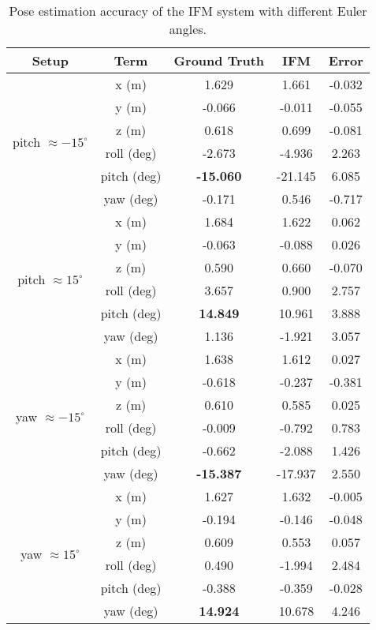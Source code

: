 \begin{table}[H]
	\caption{Pose estimation accuracy of the IFM system with different Euler angles.}
	\begin{center}
		\begin{tabular}{c|c|c|c|c}
			\hline\hline
			Setup & Term & Ground Truth &\textbf{IFM}&Error\\ \hline
			\multirow{6}{*}{ pitch $\approx -15^{\circ}$} &x (m) &1.629   & 1.661   & -0.032  \\  \cline{2-5} 
			&y (m) &-0.066  & -0.011  & -0.055  \\  \cline{2-5} 
			&z (m) &0.618   & 0.699   & -0.081  \\  \cline{2-5} 
			&roll (deg) &-2.673  & -4.936  & 2.263  \\  \cline{2-5} 
			&pitch (deg) &\textbf{-15.060} & -21.145 & 6.085 \\  \cline{2-5} 
			&yaw (deg) &-0.171  & 0.546   & -0.717 \\  \hline
			\multirow{6}{*}{ pitch $\approx 15^{\circ}$} &x (m) &1.684   & 1.622   & 0.062    \\  \cline{2-5} 
			&y (m) &-0.063  & -0.088  & 0.026  \\  \cline{2-5} 
			&z (m) &0.590   & 0.660   & -0.070  \\  \cline{2-5} 
			&roll (deg) &3.657   & 0.900   & 2.757 \\  \cline{2-5} 
			&pitch (deg) &\textbf{14.849}  & 10.961  & 3.888 \\  \cline{2-5} 
			&yaw (deg) &1.136   & -1.921  & 3.057 \\  \hline
			\multirow{6}{*}{ yaw $\approx -15^{\circ}$} &x (m) &1.638   & 1.612   & 0.027   \\  \cline{2-5} 
			&y (m) &-0.618  & -0.237  & -0.381 \\  \cline{2-5} 
			&z (m) &0.610   & 0.585   & 0.025  \\  \cline{2-5} 
			&roll (deg) &-0.009  & -0.792  & 0.783 \\  \cline{2-5} 
			&pitch (deg) &-0.662  & -2.088  & 1.426\\  \cline{2-5} 
			&yaw (deg) &\textbf{-15.387} & -17.937 & 2.550 \\  \hline
			\multirow{6}{*}{ yaw $\approx 15^{\circ}$} &x (m) &1.627   & 1.632   & -0.005  \\  \cline{2-5} 
			&y (m) &-0.194  & -0.146  & -0.048  \\  \cline{2-5} 
			&z (m) &0.609   & 0.553   & 0.057   \\  \cline{2-5} 
			&roll (deg) &0.490   & -1.994  & 2.484 \\  \cline{2-5} 
			&pitch (deg) &-0.388  & -0.359  & -0.028 \\  \cline{2-5} 
			&yaw (deg) &\textbf{14.924}  & 10.678  & 4.246 \\  \hline\hline
		\end{tabular}
		\label{tab2}
	\end{center}
\end{table}
